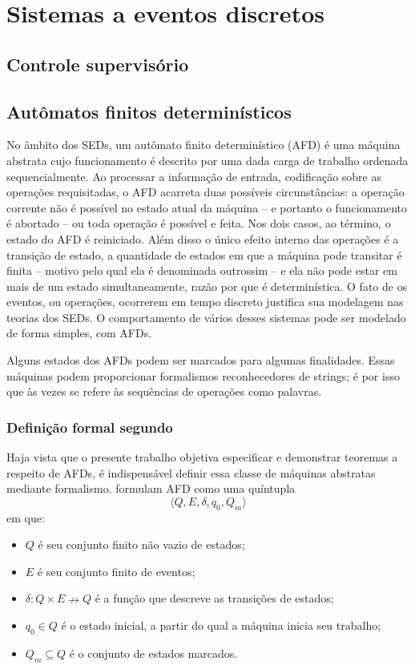 \chapter{Sistemas a eventos discretos}
\label{cap:seds}

\section{Controle supervisório}

\section{Autômatos finitos determinísticos}

No âmbito dos SEDs, um autômato finito determinístico (AFD) é uma máquina abstrata cujo funcionamento é descrito por uma dada carga de trabalho ordenada sequencialmente. Ao processar a informação de entrada, codificação sobre as operações requisitadas, o AFD acarreta duas possíveis circunstâncias: a operação corrente não é possível no estado atual da máquina -- e portanto o funcionamento é abortado -- ou toda operação é possível e feita. Nos dois casos, ao término, o estado do AFD é reiniciado. Além disso o único efeito interno das operações é a transição de estado, a quantidade de estados em que a máquina pode transitar é finita -- motivo pelo qual ela é denominada outrossim -- e ela não pode estar em mais de um estado simultaneamente, razão por que é determinística. O fato de os eventos, ou operações, ocorrerem em tempo discreto justifica sua modelagem nas teorias dos SEDs. O comportamento de vários desses sistemas pode ser modelado de forma simples, com AFDs.

Alguns estados dos AFDs podem ser marcados para algumas finalidades. Essas máquinas podem proporcionar formalismos reconhecedores de strings; é por isso que às vezes se refere às sequências de operações como palavras.

\subsection{Definição formal segundo }

Haja vista que o presente trabalho objetiva especificar e demonstrar teoremas a respeito de AFDs, é indispensável definir essa classe de máquinas abstratas mediante formalismo.  formulam AFD como uma quíntupla \begin{equation}\label{eq:afd_hopcroft}\langle Q, E, \delta, q_0, Q_m \rangle\end{equation} em que: \begin{itemize}
    \item $Q$ é seu conjunto finito não vazio de estados;
    \item $E$ é seu conjunto finito de eventos;
    \item $\delta : Q \times E \nrightarrow Q$ é a função que descreve as transições de estados;
    \item $q_0 \in Q$ é o estado inicial, a partir do qual a máquina inicia seu trabalho;
    \item $Q_m \subseteq Q$ é o conjunto de estados marcados.
\end{itemize}

